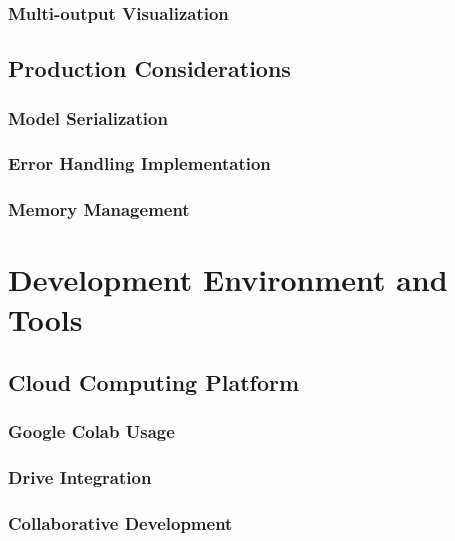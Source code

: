 \documentclass[12pt,a4paper]{report}
\begin{document}
\subsubsection{Multi-output Visualization}

\subsection{Production Considerations}

\subsubsection{Model Serialization}

\subsubsection{Error Handling Implementation}

\subsubsection{Memory Management}

\section{Development Environment and Tools}

\subsection{Cloud Computing Platform}

\subsubsection{Google Colab Usage}

\subsubsection{Drive Integration}

\subsubsection{Collaborative Development}
\end{document}
